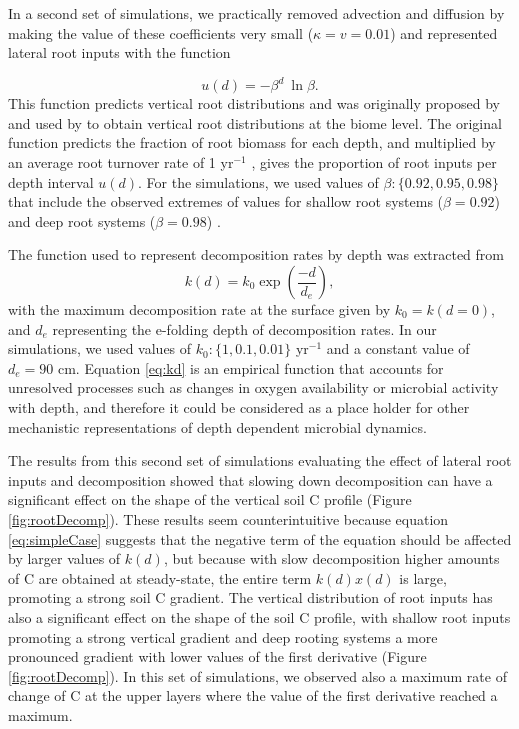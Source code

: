 \documentclass[11pt, oneside, a4paper]{article}   	%
\begin{document}
In a second set of simulations, we practically removed advection and diffusion by making the value of these coefficients very small ($\kappa = v =0.01$) and represented lateral root inputs with the function

\begin{equation} \label{eq:ud}
u(d) = - \beta^d \ \ln \beta .
\end{equation}
This function predicts vertical root distributions and was originally proposed by \citet{Gale1987} and used by \citet{Jackson1996, Jackson1997} to obtain vertical root distributions at the biome level. The original function predicts the fraction of root biomass for each depth, and multiplied by an average root turnover rate of 1 yr$^{-1}$ \citep{Gill2000}, gives the proportion of root inputs per depth interval $u(d)$. For the simulations, we used values of $\beta : \{0.92, 0.95, 0.98 \}$ that include the observed extremes of values for shallow root systems ($\beta =0.92$) and deep root systems ($\beta = 0.98$) \citep{Gale1987, Jackson1996}.

The function used to represent decomposition rates by depth was extracted from \citet{Koven2013BGS}
\begin{equation} \label{eq:kd}
k(d) = k_0 \exp \left(\frac{-d}{d_e} \right),
\end{equation}
with the maximum decomposition rate at the surface given by $k_0 = k(d=0)$, and $d_e$ representing the e-folding depth of decomposition rates. In our simulations, we used values of $k_0 : \{1, 0.1, 0.01 \}$ yr$^{-1}$ and a constant value of $d_e = 90$ cm. Equation \ref{eq:kd} is an empirical function that accounts for unresolved processes such as changes in oxygen availability or microbial activity with depth, and therefore it could be considered as a place holder for other mechanistic representations of depth dependent microbial dynamics. 

The results from this second set of simulations evaluating the effect of lateral root inputs and decomposition showed that slowing down decomposition can have a significant effect on the shape of the vertical soil C profile (Figure \ref{fig:rootDecomp}). These results seem counterintuitive because equation \ref{eq:simpleCase} suggests that the negative term of the equation should be affected by larger values of $k(d)$, but because with slow decomposition higher amounts of C are obtained at steady-state, the entire term $k(d) x(d)$ is large, promoting a strong soil C gradient. The vertical distribution of root inputs has also a significant effect on the shape of the soil C profile, with shallow root inputs promoting a strong vertical gradient and deep rooting systems a more pronounced gradient with lower values of the first derivative (Figure \ref{fig:rootDecomp}). In this set of simulations, we observed also a maximum rate of change of C at the upper layers where the value of the first derivative reached a maximum. 
\end{document}
